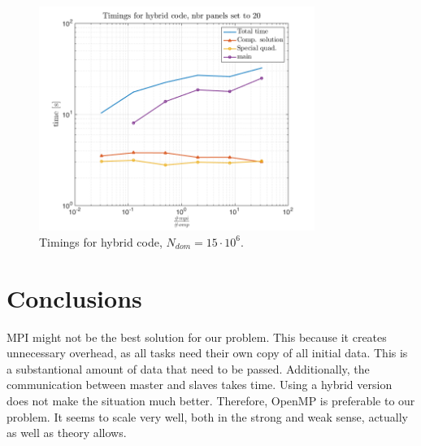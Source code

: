 \documentclass[a4paper,10pt]{article}
\begin{document}
\begin{figure}[ht]
    \begin{center}
        \includegraphics[width=0.8\textwidth]{Graphics/hybrid_plot.png}
    \end{center}
    \caption{Timings for hybrid code, $N_{dom}=15\cdot 10^6$.}
    \label{fig:hybrid}
\end{figure}
\FloatBarrier



\section*{Conclusions}
MPI might not be the best solution for our problem. This because it creates unnecessary overhead, as all tasks need their own copy of all initial data. This is a substantional amount of data that need to be passed. Additionally, the communication between master and slaves takes time. Using a hybrid version does not make the situation much better. Therefore, OpenMP is preferable to our problem. It seems to scale very well, both in the strong and weak sense, actually as well as theory allows.

\newpage
\appendix
\end{document}
